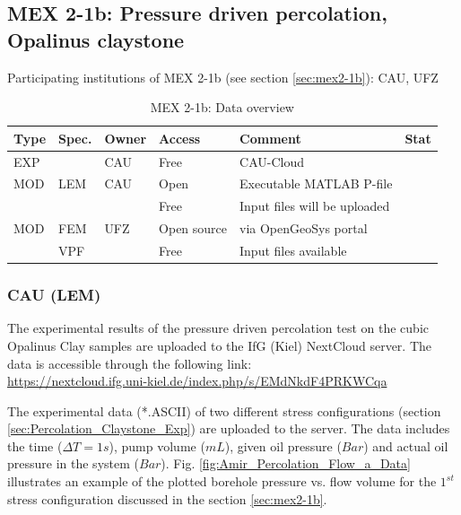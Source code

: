 \subsection{MEX 2-1b: Pressure driven percolation, Opalinus claystone}

Participating institutions of MEX 2-1b (see section \ref{sec:mex2-1b}): CAU, UFZ

\begin{table}[ht!]
\caption{MEX 2-1b: Data overview}
\label{tab:dms-mex21b-overview}
\small
\begin{tabular}{l|l|l|l|L{4.7cm}|l}
\hline
{}
Type & Spec. & Owner & Access     & Comment                       & Stat \\ 
\hline
EXP  &       & CAU   & Free       & CAU-Cloud                     &  \\
\hline \hline
MOD  & LEM   & CAU   & Open       & Executable MATLAB P-file      &  \\
     &       &       & Free       & Input files will be uploaded  &  \\
\hline
MOD  & FEM   & UFZ   & Open source & via OpenGeoSys portal        &  \\
     & VPF   &       & Free       & Input files available         &  \\
%
\hline
\end{tabular}
\end{table}
\normalsize

\subsubsection*{CAU (LEM)}

The experimental results of the pressure driven percolation test on the cubic Opalinus Clay samples are uploaded to the IfG (Kiel) NextCloud server. The data is accessible through the following link:\\
\url{https://nextcloud.ifg.uni-kiel.de/index.php/s/EMdNkdF4PRKWCqa}

The experimental data (*.ASCII) of two different stress configurations (section \ref{sec:Percolation_Claystone_Exp}) are uploaded to the server. The data includes the time ($\Delta T=1s$), pump volume ($mL$), given oil pressure ($Bar$) and actual oil pressure in the system ($Bar$). Fig. \ref{fig:Amir_Percolation_Flow_a_Data}
illustrates an example of the plotted borehole pressure vs. flow volume for the $1^{st}$ stress configuration discussed in the section \ref{sec:mex2-1b}.

